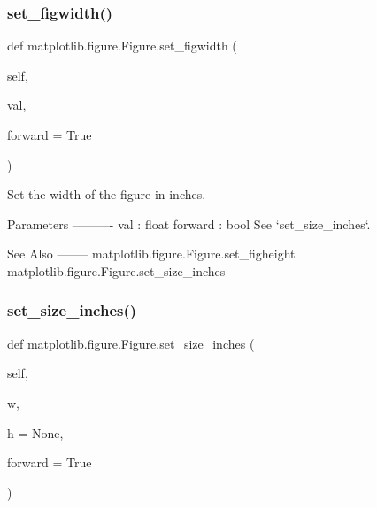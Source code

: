 \subsubsection{\texorpdfstring{set\+\_\+figwidth()}{set\_figwidth()}}
{\footnotesize\ttfamily def matplotlib.\+figure.\+Figure.\+set\+\_\+figwidth (\begin{DoxyParamCaption}\item[{}]{self,  }\item[{}]{val,  }\item[{}]{forward = {\ttfamily True} }\end{DoxyParamCaption})}

\begin{DoxyVerb}Set the width of the figure in inches.

Parameters
----------
val : float
forward : bool
    See `set_size_inches`.

See Also
--------
matplotlib.figure.Figure.set_figheight
matplotlib.figure.Figure.set_size_inches
\end{DoxyVerb}
 \mbox{\label{classmatplotlib_1_1figure_1_1Figure_acebcf6b8f7b0378bdd68154eb99520b2}} 
\subsubsection{\texorpdfstring{set\+\_\+size\+\_\+inches()}{set\_size\_inches()}}
{\footnotesize\ttfamily def matplotlib.\+figure.\+Figure.\+set\+\_\+size\+\_\+inches (\begin{DoxyParamCaption}\item[{}]{self,  }\item[{}]{w,  }\item[{}]{h = {\ttfamily None},  }\item[{}]{forward = {\ttfamily True} }\end{DoxyParamCaption})}

